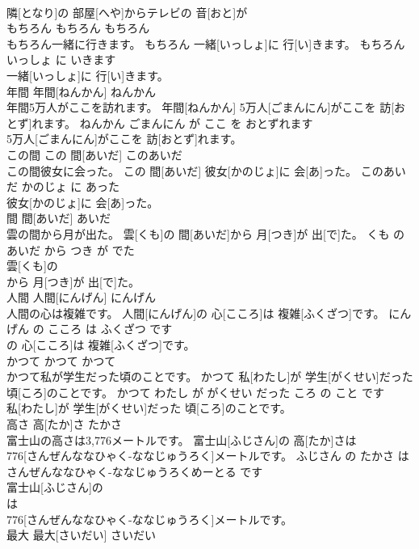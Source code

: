 \documentclass[8pt]{extreport}
\begin{document}
\begin{CJK}{UTF8}{min}
\\	隣[となり]の 部屋[へや]からテレビの 音[おと]が
\\	もちろん	もちろん	もちろん	
\\	もちろん一緒に行きます。	もちろん 一緒[いっしょ]に 行[い]きます。	もちろん いっしょ に いきます	
\\	一緒[いっしょ]に 行[い]きます。		
\\	年間	年間[ねんかん]	ねんかん	
\\	年間5万人がここを訪れます。	年間[ねんかん] 5万人[ごまんにん]がここを 訪[おとず]れます。	ねんかん ごまんにん が ここ を おとずれます	
\\	5万人[ごまんにん]がここを 訪[おとず]れます。		
\\	この間	この 間[あいだ]	このあいだ	
\\	この間彼女に会った。	この 間[あいだ] 彼女[かのじょ]に 会[あ]った。	このあいだ かのじょ に あった	
\\	彼女[かのじょ]に 会[あ]った。		
\\	間	間[あいだ]	あいだ	
\\	雲の間から月が出た。	雲[くも]の 間[あいだ]から 月[つき]が 出[で]た。	くも の あいだ から つき が でた	
\\	雲[くも]の
\\	から 月[つき]が 出[で]た。		
\\	人間	人間[にんげん]	にんげん	
\\	人間の心は複雑です。	人間[にんげん]の 心[こころ]は 複雑[ふくざつ]です。	にんげん の こころ は ふくざつ です	
\\	の 心[こころ]は 複雑[ふくざつ]です。		
\\	かつて	かつて	かつて	
\\	かつて私が学生だった頃のことです。	かつて 私[わたし]が 学生[がくせい]だった 頃[ころ]のことです。	かつて わたし が がくせい だった ころ の こと です	
\\	私[わたし]が 学生[がくせい]だった 頃[ころ]のことです。		
\\	高さ	高[たか]さ	たかさ	
\\	富士山の高さは3,776メートルです。	富士山[ふじさん]の 高[たか]さは 
\\	776[さんぜんななひゃく-ななじゅうろく]メートルです。	ふじさん の たかさ は さんぜんななひゃく-ななじゅうろくめーとる です	
\\	富士山[ふじさん]の
\\	は 
\\	776[さんぜんななひゃく-ななじゅうろく]メートルです。		
\\	最大	最大[さいだい]	さいだい	

\end{CJK}
\end{document}
